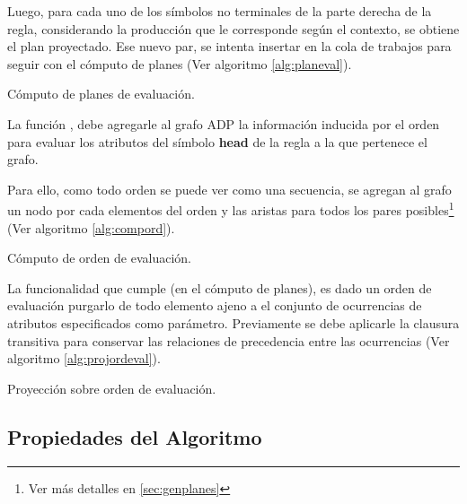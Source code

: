 Luego, para cada uno de los símbolos no terminales de la parte derecha de la regla, considerando la producción que le corresponde según el contexto, se obtiene el plan proyectado. Ese nuevo par, se intenta insertar en la cola de trabajos para seguir con el cómputo de planes (Ver algoritmo \ref{alg:planeval}).

\begin{algorithm}[!ht]

\vspace{-0.5cm}
\caption{\label{alg:planeval}Cómputo de planes de evaluación.}
\end{algorithm}

La función , debe agregarle al grafo ADP la información inducida por el orden para evaluar los atributos del símbolo \textbf{head} de la regla a la que pertenece el grafo.

Para ello, como todo orden se puede ver como una secuencia, se agregan al grafo un nodo por cada elementos del orden y las aristas para todos los pares posibles\footnote{Ver más detalles en \ref{sec:genplanes}} (Ver algoritmo \ref{alg:compord}).

\begin{algorithm}[!ht]

\vspace{-0.5cm}
\caption{\label{alg:compord}Cómputo de orden de evaluación.}
\end{algorithm}

La funcionalidad que cumple  (en el cómputo de planes), es dado un orden de evaluación purgarlo de todo elemento ajeno a el conjunto de ocurrencias de atributos especificados como parámetro. Previamente se debe aplicarle la clausura transitiva para conservar las relaciones de precedencia entre las ocurrencias (Ver algoritmo \ref{alg:projordeval}).

\begin{algorithm}[!ht]

\vspace{-0.5cm}
\caption{\label{alg:projordeval}Proyección sobre orden de evaluación.}
\end{algorithm}

\subsection*{Propiedades del Algoritmo}

